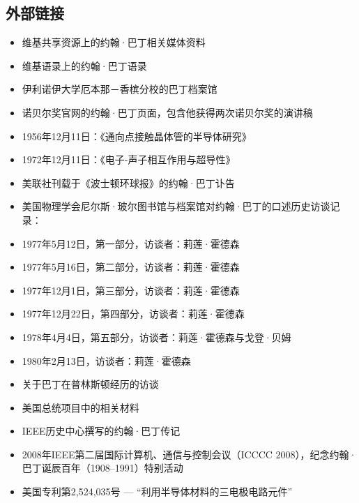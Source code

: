 \subsection{外部链接}
\begin{itemize}
\item 维基共享资源上的约翰·巴丁相关媒体资料
\item 维基语录上的约翰·巴丁语录
\item 伊利诺伊大学厄本那－香槟分校的巴丁档案馆
\item 诺贝尔奖官网的约翰·巴丁页面，包含他获得两次诺贝尔奖的演讲稿
\item 1956年12月11日：《通向点接触晶体管的半导体研究》
\item 1972年12月11日：《电子-声子相互作用与超导性》
\item 美联社刊载于《波士顿环球报》的约翰·巴丁讣告
\item 美国物理学会尼尔斯·玻尔图书馆与档案馆对约翰·巴丁的口述历史访谈记录：
\item 1977年5月12日，第一部分，访谈者：莉莲·霍德森
\item 1977年5月16日，第二部分，访谈者：莉莲·霍德森
\item 1977年12月1日，第三部分，访谈者：莉莲·霍德森
\item 1977年12月22日，第四部分，访谈者：莉莲·霍德森
\item 1978年4月4日，第五部分，访谈者：莉莲·霍德森与戈登·贝姆
\item 1980年2月13日，访谈者：莉莲·霍德森
\item 关于巴丁在普林斯顿经历的访谈
\item 美国总统项目中的相关材料
\item IEEE历史中心撰写的约翰·巴丁传记
\item 2008年IEEE第二届国际计算机、通信与控制会议（ICCCC 2008），纪念约翰·巴丁诞辰百年（1908–1991）特别活动
\item 美国专利第2,524,035号 — “利用半导体材料的三电极电路元件”
\end{itemize}
